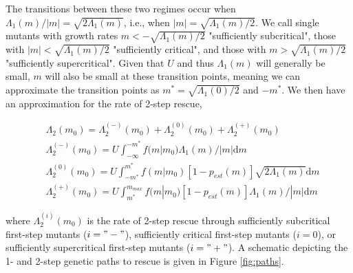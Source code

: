 \documentclass[9pt,twocolumn,twoside,lineno]{gsajnl}
\begin{document}
The transitions between these two regimes occur when $\Lambda_1(m)/ |m| = \sqrt{2\Lambda_1(m)}$, i.e., when $|m| = \sqrt{\Lambda_1(m)/2}$.
We call single mutants with growth rates $m < -\sqrt{\Lambda_1(m)/2}$ "sufficiently subcritical", those with $|m| < \sqrt{\Lambda_1(m)/2}$ "sufficiently critical", and those with $m > \sqrt{\Lambda_1(m)/2}$ "sufficiently supercritical".
Given that $U$ and thus $\Lambda_1(m)$ will generally be small, $m$ will also be small at these transition points, meaning we can approximate the transition points as $m^* = \sqrt{\Lambda_1(0)/2}$ and $-m^*$.
We then have an approximation for the rate of 2-step rescue, 

\begin{equation}\label{eq:p2tilde}
\begin{aligned}
&\Lambda_2(m_0) = \Lambda_2^{(-)}(m_0) + \Lambda_2^{(0)}(m_0) + \Lambda_2^{(+)}(m_0)\\
& \Lambda_2^{(-)}(m_0) = U \int_{-\infty}^{-m^*} f(m|m_0)  \Lambda_1(m)/ |m| \mathrm{d}m\\
& \Lambda_2^{(0)}(m_0) = U \int_{-m^*}^{m^*} f(m|m_0) \left[ 1 - p_{est}(m) \right] \sqrt{2\Lambda_1(m)} \mathrm{d}m\\
& \Lambda_2^{(+)}(m_0) = U \int_{m^*}^{m_{max}} f(m|m_0) \left[ 1 - p_{est}(m) \right] \Lambda_1(m)/ |m| \mathrm{d}m
\end{aligned}
\end{equation}

\noindent where $\Lambda_2^{(i)}(m_0)$ is the rate of 2-step rescue through sufficiently subcritical first-step mutants ($i="-"$), sufficiently critical first-step mutants ($i=0$), or sufficiently supercritical first-step mutants ($i="+"$).
A schematic depicting the 1- and 2-step genetic paths to rescue is given in Figure \ref{fig:paths}.
\end{document}
